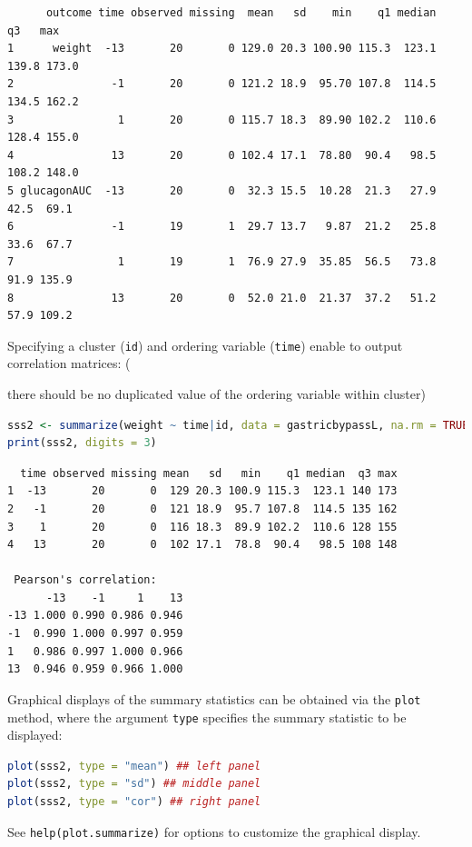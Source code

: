 \documentclass[12pt]{article}
\newcommand\Warning[1][3ex]{%
\renewcommand\stacktype{L}%
\scaleto{\stackon[1.3pt]{\color{red}$\triangle$}{\tiny\bfseries !}}{#1}%
\xspace
}
\begin{document}
\label{}
\begin{verbatim}
      outcome time observed missing  mean   sd    min    q1 median    q3   max
1      weight  -13       20       0 129.0 20.3 100.90 115.3  123.1 139.8 173.0
2               -1       20       0 121.2 18.9  95.70 107.8  114.5 134.5 162.2
3                1       20       0 115.7 18.3  89.90 102.2  110.6 128.4 155.0
4               13       20       0 102.4 17.1  78.80  90.4   98.5 108.2 148.0
5 glucagonAUC  -13       20       0  32.3 15.5  10.28  21.3   27.9  42.5  69.1
6               -1       19       1  29.7 13.7   9.87  21.2   25.8  33.6  67.7
7                1       19       1  76.9 27.9  35.85  56.5   73.8  91.9 135.9
8               13       20       0  52.0 21.0  21.37  37.2   51.2  57.9 109.2
\end{verbatim}


\noindent Specifying a cluster (\texttt{id}) and ordering variable (\texttt{time})
enable to output correlation matrices: \newline (\Warning there should be
no duplicated value of the ordering variable within cluster)
\begin{lstlisting}[language=r,numbers=none]
sss2 <- summarize(weight ~ time|id, data = gastricbypassL, na.rm = TRUE)
print(sss2, digits = 3)
\end{lstlisting}

\label{}
\begin{verbatim}
  time observed missing mean   sd   min    q1 median  q3 max
1  -13       20       0  129 20.3 100.9 115.3  123.1 140 173
2   -1       20       0  121 18.9  95.7 107.8  114.5 135 162
3    1       20       0  116 18.3  89.9 102.2  110.6 128 155
4   13       20       0  102 17.1  78.8  90.4   98.5 108 148

 Pearson's correlation: 
      -13    -1     1    13
-13 1.000 0.990 0.986 0.946
-1  0.990 1.000 0.997 0.959
1   0.986 0.997 1.000 0.966
13  0.946 0.959 0.966 1.000
\end{verbatim}

Graphical displays of the summary statistics can be obtained via the
\texttt{plot} method, where the argument \texttt{type} specifies the summary
statistic to be displayed:
\begin{lstlisting}[language=r,numbers=none]
plot(sss2, type = "mean") ## left panel
plot(sss2, type = "sd") ## middle panel
plot(sss2, type = "cor") ## right panel
\end{lstlisting}

See \texttt{help(plot.summarize)} for options to customize the graphical
display.
\end{document}

